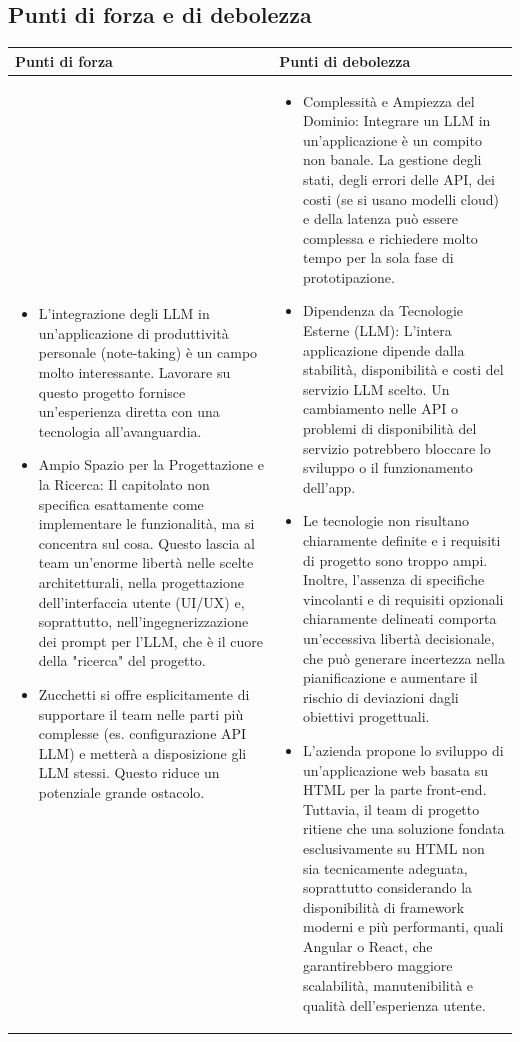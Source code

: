 \documentclass[a4paper,11pt]{article}
\begin{document}
\subsection{Punti di forza e di debolezza}
{\footnotesize
\begin{tabularx}{\textwidth}{|X|X|}
\hline
\rowcolor{lightgray!40} %
\textbf{Punti di forza} & \textbf{Punti di debolezza} \\
\hline
\begin{itemize}
\item  L'integrazione degli LLM in un'applicazione di produttività personale (note-taking) è un campo molto interessante. Lavorare su questo progetto fornisce un'esperienza diretta con una tecnologia all'avanguardia.
\item  Ampio Spazio per la Progettazione e la Ricerca: Il capitolato non specifica esattamente come implementare le funzionalità, ma si concentra sul cosa. Questo lascia al team un'enorme libertà nelle scelte architetturali, nella progettazione dell'interfaccia utente (UI/UX) e, soprattutto, nell'ingegnerizzazione dei prompt per l'LLM, che è il cuore della "ricerca" del progetto.
\item Zucchetti si offre esplicitamente di supportare il team nelle parti più complesse (es. configurazione API LLM) e metterà a disposizione gli LLM stessi. Questo riduce un potenziale grande ostacolo.
\end{itemize}
 & \begin{itemize}
\item Complessità e Ampiezza del Dominio:
Integrare un LLM in un'applicazione è un compito non banale. La gestione degli stati, degli errori delle API, dei costi (se si usano modelli cloud) e della latenza può essere complessa e richiedere molto tempo per la sola fase di prototipazione.
\item 	Dipendenza da Tecnologie Esterne (LLM):
L'intera applicazione dipende dalla stabilità, disponibilità e costi del servizio LLM scelto. Un cambiamento nelle API o problemi di disponibilità del servizio potrebbero bloccare lo sviluppo o il funzionamento dell'app.
\item Le tecnologie non risultano chiaramente definite e i requisiti di progetto sono troppo ampi. Inoltre, l’assenza di specifiche vincolanti e di requisiti opzionali chiaramente delineati comporta un’eccessiva libertà decisionale, che può generare incertezza nella pianificazione e aumentare il rischio di deviazioni dagli obiettivi progettuali.
\item  L’azienda propone lo sviluppo di un’applicazione web basata su HTML per la parte front-end. Tuttavia, il team di progetto ritiene che una soluzione fondata esclusivamente su HTML non sia tecnicamente adeguata, soprattutto considerando la disponibilità di framework moderni e più performanti, quali Angular o React, che garantirebbero maggiore scalabilità, manutenibilità e qualità dell’esperienza utente. 
\end{itemize} \\
\hline
\end{tabularx}
}
\end{document}

